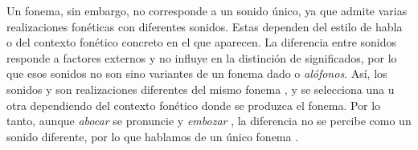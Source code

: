 Un fonema, sin embargo, no corresponde a un sonido único, ya que admite varias realizaciones fonéticas con diferentes sonidos. Estas dependen del estilo de habla o del contexto fonético concreto en el que aparecen. La diferencia entre sonidos responde a factores externos y no influye en la distinción de significados, por lo que esos sonidos no son sino variantes de un fonema dado \parencite[231]{jakobson1962a} o \textit{alófonos}.  Así, los sonidos \ipa{[β]} y \ipa{[b]} son realizaciones diferentes del mismo fonema , y se selecciona una u otra dependiendo del contexto fonético donde se produzca el fonema. Por lo tanto, aunque \textit{abocar} se pronuncie \ipa{[aβoˈkaɾ]} y \textit{embozar} \textipa{[emboˈθaɾ]}, la diferencia no se percibe como un sonido diferente, por lo que hablamos de un único fonema .

